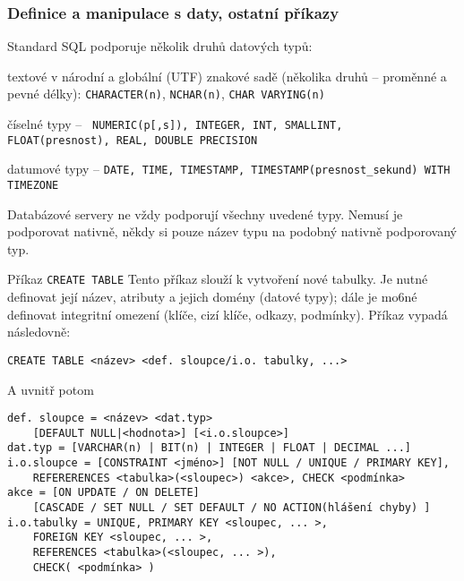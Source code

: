 \subsubsection*{Definice a manipulace s daty, ostatní příkazy}

Standard SQL podporuje několik druhů datových typů:
\begin{pitemize}
    \item textové v národní a globální (UTF) znakové sadě (několika druhů -- proměnné a pevné délky): \texttt{CHARACTER(n)}, \texttt{NCHAR(n)},
    \texttt{CHAR VARYING(n)}
    \item číselné typy -- \texttt{ NUMERIC(p[,s]), INTEGER, INT, SMALLINT,\\  FLOAT(presnost), REAL, DOUBLE PRECISION}
    \item datumové typy -- \texttt{DATE, TIME, TIMESTAMP, TIMESTAMP(presnost\_sekund) WITH TIMEZONE}
\end{pitemize}
Databázové servery ne vždy podporují všechny uvedené typy. Nemusí je podporovat nativně, někdy si pouze  název typu na podobný nativně podporovaný typ.

\medskip
\begin{obecne}{Příkaz \texttt{CREATE TABLE}}
Tento příkaz slouží k vytvoření nové tabulky. Je nutné definovat její název, atributy a jejich domény (datové typy); dále je mo6né definovat integritní omezení (klíče, cizí klíče, odkazy, podmínky). Příkaz vypadá následovně:
\begin{center}
\texttt{CREATE TABLE <název> <def. sloupce/i.o. tabulky, ...> }
\end{center}
A uvnitř potom
\begin{verbatim}
def. sloupce = <název> <dat.typ> 
    [DEFAULT NULL|<hodnota>] [<i.o.sloupce>] 
dat.typ = [VARCHAR(n) | BIT(n) | INTEGER | FLOAT | DECIMAL ...] 
i.o.sloupce = [CONSTRAINT <jméno>] [NOT NULL / UNIQUE / PRIMARY KEY], 
    REFERERENCES <tabulka>(<sloupec>) <akce>, CHECK <podmínka> 
akce = [ON UPDATE / ON DELETE] 
    [CASCADE / SET NULL / SET DEFAULT / NO ACTION(hlášení chyby) ] 
i.o.tabulky = UNIQUE, PRIMARY KEY <sloupec, ... >, 
    FOREIGN KEY <sloupec, ... >, 
    REFERENCES <tabulka>(<sloupec, ... >), 
    CHECK( <podmínka> )
\end{verbatim}
\end{obecne}

